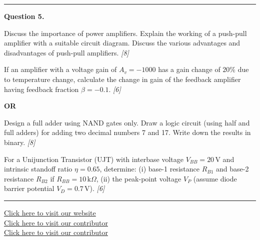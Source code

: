\documentclass[11pt,a4paper]{article}
\newcommand{\pts}[1]{\hfill   \textit{[#1]}}
\begin{document}
\medskip\rule{\linewidth}{0.2pt}




\noindent   \textbf{Question 5.}

\begin{parts}
  \item Discuss the importance of power amplifiers. Explain the working of a push-pull amplifier with a suitable circuit diagram. Discuss the various advantages and disadvantages of push-pull amplifiers. \pts{8}
  \item If an amplifier with a voltage gain of $A_v = -1000$ has a gain change of $20\%$ due to temperature change, calculate the change in gain of the feedback amplifier having feedback fraction $\beta = -0.1$. \pts{6}
\end{parts}
\hfill   \textbf{OR}

\begin{parts}
  \item Design a full adder using NAND gates only. Draw a logic circuit (using half and full adders) for adding two decimal numbers 7 and 17. Write down the results in binary. \pts{8}
  \item For a Unijunction Transistor (UJT) with interbase voltage $V_{BB} = 20\, \text{V}$ and intrinsic standoff ratio $\eta = 0.65$, determine: (i) base-1 resistance $R_{B1}$ and base-2 resistance $R_{B2}$ if $R_{BB} = 10\, \text{k}\Omega$, (ii) the peak-point voltage $V_P$ (assume diode barrier potential $V_D = 0.7\, \text{V}$). \pts{6}
\end{parts}

\vfill
\rule{\linewidth}{0.4pt}

\begin{center}\small
  \href{https://bhu-exam.vercel.app/}{Click here to visit our website}\\[4pt]
  \href{https://me-aryan.vercel.app/}{Click here to visit our contributor}\\[4pt]
  \href{https://quashan-me.vercel.app/}{Click here to visit our contributor}
\end{center}
\end{document}
